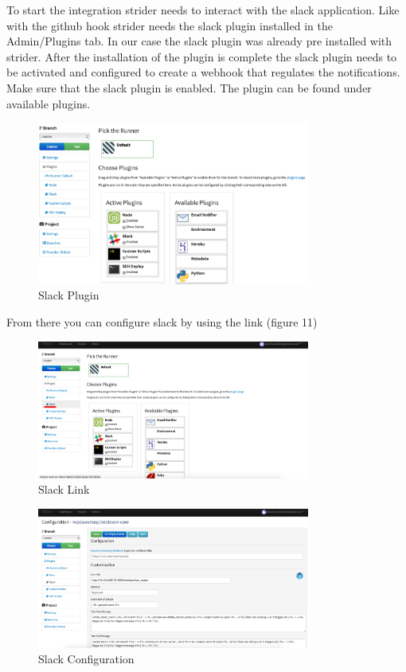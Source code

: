 To start the integration strider needs to interact with the slack application. Like with the github hook strider needs the slack
plugin installed in the Admin/Plugins tab. In our case the slack plugin was already pre installed with strider. After the installation
of the plugin is complete the slack plugin needs to be activated and configured to create a webhook that regulates the notifications.
Make sure that the slack plugin is enabled. The plugin can be found under available plugins.

\begin{figure}[h!]
  \centering
      \includegraphics[width=0.8\textwidth]{images/slack.png}
  \caption{Slack Plugin}
\end{figure}

From there you can configure slack by using the link (figure 11)

\begin{figure}[h!]
  \centering
  \includegraphics[width=0.8\textwidth]{images/slack_link.png}
  \caption{Slack Link}
\end{figure}

\begin{figure}[h!]
  \centering
  \includegraphics[width=0.8\textwidth]{images/slack_config.png}
  \caption{Slack Configuration}
\end{figure}

